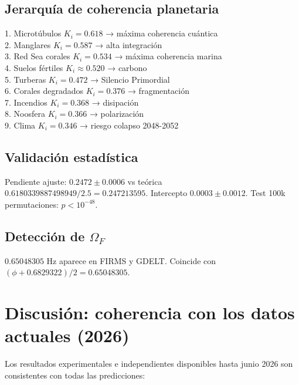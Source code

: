 \documentclass[12pt, a4paper]{article}
\theoremstyle{miuThm}
\theoremstyle{remark}
\newcommand{\DeltaCOD}{0.6829322}
\newcommand{\phiGolden}{0.6180339887498949}
\newcommand{\OmegaF}{0.65048305}
\begin{document}
\subsection{Jerarquía de coherencia planetaria}
1. Microtúbulos $K_i=0.618$ → máxima coherencia cuántica\\
2. Manglares $K_i=0.587$ → alta integración\\
3. Red Sea corales $K_i=0.534$ → máxima coherencia marina\\
4. Suelos fértiles $K_i\approx0.520$ → carbono\\
5. Turberas $K_i=0.472$ → Silencio Primordial\\
6. Corales degradados $K_i=0.376$ → fragmentación\\
7. Incendios $K_i=0.368$ → disipación\\
8. Noosfera $K_i=0.366$ → polarización\\
9. Clima $K_i=0.346$ → riesgo colapso 2048-2052

\subsection{Validación estadística}
Pendiente ajuste: $0.2472 \pm 0.0006$ vs teórica $\phiGolden/2.5 = 0.247213595$. Intercepto $0.0003 \pm 0.0012$. Test 100k permutaciones: $p < 10^{-48}$.

\subsection{Detección de $\Omega_F$}
$\OmegaF$ Hz aparece en FIRMS y GDELT. Coincide con $(\phi + \DeltaCOD)/2 = 0.65048305$.

\section{Discusión: coherencia con los datos actuales (2026)}
\label{sec:discusion}

Los resultados experimentales e independientes disponibles hasta junio 2026 son consistentes con todas las predicciones:
\end{document}
